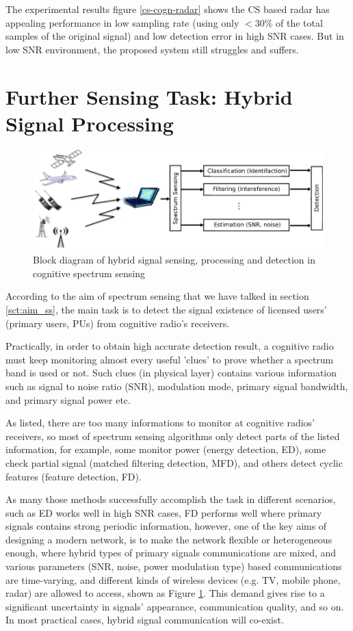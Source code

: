 The experimental results figure \ref{cs-cogn-radar} shows the CS based radar has appealing performance in low sampling rate (using only $ < 30\%$ of the total samples of the original signal) and low detection error in high SNR cases. But in low SNR environment, the proposed system still struggles and suffers. 

\newpage

\section{Further Sensing Task: Hybrid Signal Processing}

\begin{figure}
\centering
\includegraphics[width=0.75\columnwidth]{figs/hybrid_dsp.pdf}
\caption{Block diagram of hybrid signal sensing, processing and detection in cognitive spectrum sensing}
\label{hybrid_dsp}
\end{figure} 

According to the aim of spectrum sensing that we have talked in section \ref{sct:aim_ss}, the main task is to detect the signal existence of licensed users' (primary users, PUs) from cognitive radio's receivers.

Practically, in order to obtain high accurate detection result, a cognitive radio must keep monitoring almost every useful 'clues' to prove whether a spectrum band is used or not. Such clues (in physical layer) contains various information such as
signal to noise ratio (SNR), modulation mode, primary signal bandwidth, and primary signal power etc. 

As listed, there are too many informations to monitor at cognitive radios' receivers, so most of spectrum sensing algorithms only detect parts of the listed information, for example, some monitor power (energy detection, ED), some check partial signal (matched filtering detection, MFD), and others detect cyclic features (feature detection, FD). 

As many those methods successfully accomplish the task in different scenarios, such as ED works well in high SNR cases, FD performs well where primary signals contains strong periodic information, however, one of the key aims of designing a modern network, is to make the network flexible or heterogeneous enough, where hybrid types of primary signals communications are mixed, and  various parameters (SNR, noise, power modulation type) based communications are time-varying, and different kinds of wireless devices (e.g. TV, mobile phone, radar) are allowed to access, shown as Figure \ref{hybrid_dsp}. This demand gives rise to a significant uncertainty in signals' appearance, communication quality, and so on. In most practical cases, hybrid signal communication will co-exist. 

